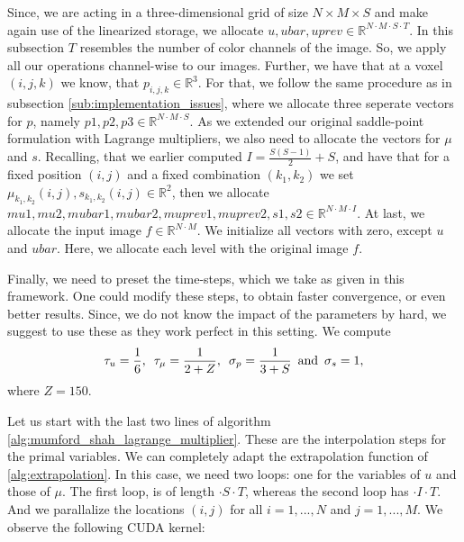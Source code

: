 \documentclass{scrreprt}
\begin{document}
            Since, we are acting in a three-dimensional grid of size $N \times M \times S$ and make again use of the linearized storage, we allocate $u, ubar, uprev \in \mathbb{R}^{N \cdot M \cdot S \cdot T}$. In this subsection $T$ resembles the number of color channels of the image. So, we apply all our operations channel-wise to our images. Further, we have that at a voxel $(i,j,k)$ we know, that $p_{i,j,k} \in \mathbb{R}^{3}$. For that, we follow the same procedure as in subsection \ref{sub:implementation_issues}, where we allocate three seperate vectors for $p$, namely $p1, p2, p3 \in \mathbb{R}^{N \cdot M \cdot S}$. As we extended our original saddle-point formulation with Lagrange multipliers, we also need to allocate the vectors for $\mu$ and $s$. Recalling, that we earlier computed $I = \frac{S(S-1)}{2} + S$, and have that for a fixed position $(i,j)$ and a fixed combination $(k_{1}, k_{2})$ we set $\mu_{k_{1}, k_{2}}(i,j), s_{k_{1}, k_{2}}(i,j) \in \mathbb{R}^{2}$, then we allocate $mu1, mu2, mubar1, mubar2, muprev1, muprev2, s1, s2 \in \mathbb{R}^{N \cdot M \cdot I}$. At last, we allocate the input image $f \in \mathbb{R}^{N \cdot M}$. We initialize all vectors with zero, except $u$ and $ubar$. Here, we allocate each level with the original image $f$.

            Finally, we need to preset the time-steps, which we take as given in this framework. One could modify these steps, to obtain faster convergence, or even better results. Since, we do not know the impact of the parameters by hard, we suggest to use these as they work perfect in this setting. We compute
                $$
                    \tau_{u} = \frac{1}{6}, \,\,\, \tau_{\mu} = \frac{1}{2 + Z}, \,\,\, \sigma_{p} = \frac{1}{3 + S} \,\,\, \textnormal{and} \,\,\, \sigma_{s} = 1,
                $$
            where $Z = 150$.

            Let us start with the last two lines of algorithm \ref{alg:mumford_shah_lagrange_multiplier}. These are the interpolation steps for the primal variables. We can completely adapt the extrapolation function of \ref{alg:extrapolation}. In this case, we need two loops: one for the variables of $u$ and those of $\mu$. The first loop, is of length $\cdot S \cdot T$, whereas the second loop has $\cdot I \cdot T$. And we parallalize the locations $(i,j)$ for all $i = 1, ..., N$ and $j = 1, ..., M$. We observe the following CUDA kernel:
\end{document}
